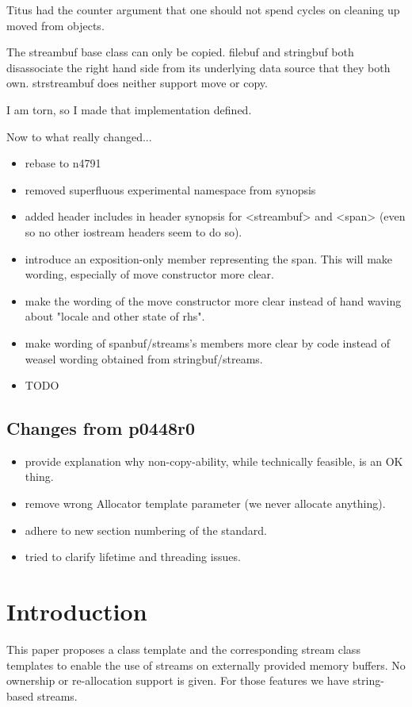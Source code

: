\documentclass[ebook,11pt,article]{memoir}
\begin{document}
Titus had the counter argument that one should not spend cycles on cleaning up moved from objects.
 
The streambuf base class can only be copied. filebuf and stringbuf both disassociate the right hand side from its underlying data source that they both own. strstreambuf does neither support move or copy. 

I am torn, so I made that implementation defined.

Now to what really changed...
\begin{itemize}
\item rebase to n4791
\item removed superfluous experimental namespace from synopsis
\item added header includes in header synopsis for <streambuf> and <span> (even so no other iostream headers seem to do so).
\item introduce an exposition-only member  representing the span. This will make wording, especially of move constructor more clear. 
\item make the wording of the move constructor more clear instead of hand waving about "locale and other state of rhs".
\item make wording of spanbuf/streams's members more clear by code instead of weasel wording obtained from stringbuf/streams.
\item TODO
\end{itemize}



\section{Changes from p0448r0}
\begin{itemize}
\item provide explanation why non-copy-ability, while technically feasible, is an OK thing.
\item remove wrong Allocator template parameter (we never allocate anything).
\item adhere to new section numbering of the standard.
\item tried to clarify lifetime and threading issues.
\end{itemize}


\chapter{Introduction}
This paper proposes a class template  and the corresponding stream class templates to enable the use of streams on externally provided memory buffers. No ownership or re-allocation support is given. For those features we have string-based streams.
\end{document}
